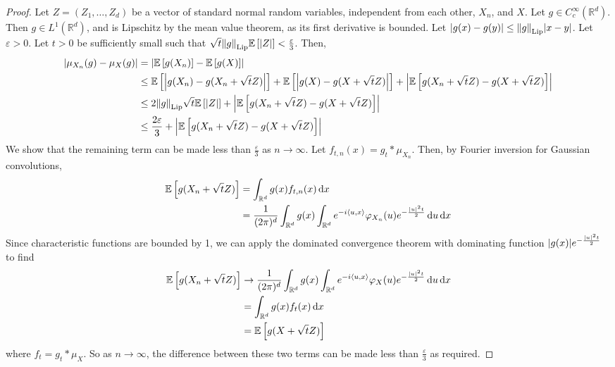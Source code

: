 \begin{proof}
	Let \( Z = (Z_1, \dots, Z_d) \) be a vector of standard normal random variables, independent from each other, \( X_n \), and \( X \).
	Let \( g \in C_c^\infty(\mathbb R^d) \).
	Then \( g \in L^1(\mathbb R^d) \), and is Lipschitz by the mean value theorem, as its first derivative is bounded.
	Let \( \abs{g(x) - g(y)} \leq \norm{g}_{\mathrm{Lip}} \abs{x - y} \).
	Let \( \varepsilon > 0 \).
	Let \( t > 0 \) be sufficiently small such that \( \sqrt t \norm{g}_{\mathrm{Lip}} \mathbb{E}\left[{\abs{Z}}\right] < \frac{\varepsilon}{3} \).
	Then,
	\begin{align*}
		\abs{\mu_{X_n}(g) - \mu_X(g)} &= \abs{\mathbb{E}\left[{g(X_n)}\right] - \mathbb{E}\left[{g(X)}\right]} \\
		&\leq \mathbb{E}\left[{\abs{g(X_n) - g(X_n + \sqrt t Z)}}\right] + \mathbb{E}\left[{\abs{g(X) - g(X + \sqrt t Z)}}\right] + \abs{\mathbb{E}\left[{g(X_n + \sqrt t Z) - g(X + \sqrt t Z)}\right]} \\
		&\leq 2\norm{g}_{\mathrm{Lip}}\sqrt t \mathbb{E}\left[{\abs{Z}}\right] + \abs{\mathbb{E}\left[{g(X_n + \sqrt t Z) - g(X + \sqrt t Z)}\right]} \\
		&\leq \frac{2\varepsilon}{3} + \abs{\mathbb{E}\left[{g(X_n + \sqrt t Z) - g(X + \sqrt t Z)}\right]}
	\end{align*}
	We show that the remaining term can be made less than \( \frac{\varepsilon}{3} \) as \( n \to \infty \).
	Let \( f_{t,n}(x) = g_t \ast \mu_{X_n} \).
	Then, by Fourier inversion for Gaussian convolutions,
	\begin{align*}
		\mathbb{E}\left[{g(X_n + \sqrt t Z)}\right] &= \int_{\mathbb R^d} g(x) f_{t,n}(x) \dd{x} \\
		&= \frac{1}{(2\pi)^d} \int_{\mathbb R^d} g(x) \int_{\mathbb R^d} e^{-i\left\langle{u,x}\right\rangle} \varphi_{X_n}(u) e^{-\frac{\abs{u}^2 t}{2}} \dd{u} \dd{x}
	\end{align*}
	Since characteristic functions are bounded by 1, we can apply the dominated convergence theorem with dominating function \( \abs{g(x)} e^{-\frac{\abs{u}^2 t}{2}} \) to find
	\begin{align*}
		\mathbb{E}\left[{g(X_n + \sqrt t Z)}\right] &\to \frac{1}{(2\pi)^d} \int_{\mathbb R^d} g(x) \int_{\mathbb R^d} e^{-i\left\langle{u,x}\right\rangle} \varphi_X(u) e^{-\frac{\abs{u}^2 t}{2}} \dd{u} \dd{x} \\
		&= \int_{\mathbb R^d} g(x) f_t(x) \dd{x} \\
		&= \mathbb{E}\left[{g(X + \sqrt t Z)}\right]
	\end{align*}
	where \( f_t = g_t \ast \mu_X \).
	So as \( n \to \infty \), the difference between these two terms can be made less than \( \frac{\varepsilon}{3} \) as required.
\end{proof}
